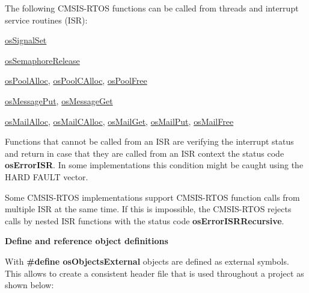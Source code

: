 The following C\+M\+S\+I\+S-\/\+R\+T\+OS functions can be called from threads and interrupt service routines (I\+SR)\+:
\begin{DoxyItemize}
\item \mbox{\hyperlink{cmsis__os_8h_a3de2730654589d6c3559c4b9e2825553}{os\+Signal\+Set}}
\item \mbox{\hyperlink{cmsis__os_8h_ab108914997c49e14d8ff1ae0d1988ca0}{os\+Semaphore\+Release}}
\item \mbox{\hyperlink{cmsis__os_8h_ab4bc93bf17f94ca99363e53e1a763fb5}{os\+Pool\+Alloc}}, \mbox{\hyperlink{cmsis__os_8h_ab22c2f194e0f0b05494aa0e9c97d7a51}{os\+Pool\+C\+Alloc}}, \mbox{\hyperlink{cmsis__os_8h_a4a861e9c469c9d0daf5721bf174f8e54}{os\+Pool\+Free}}
\item \mbox{\hyperlink{cmsis__os_8h_ac0dcf462fc92de8ffaba6cc004514a6d}{os\+Message\+Put}}, \mbox{\hyperlink{cmsis__os_8h_a6c6892b8f2296cca6becd57ca2d7e1ae}{os\+Message\+Get}}
\item \mbox{\hyperlink{cmsis__os_8h_ac985d7f260b80d7891157697b760aa02}{os\+Mail\+Alloc}}, \mbox{\hyperlink{cmsis__os_8h_a9e492e5839bf0d2bf66492e70eae3ddb}{os\+Mail\+C\+Alloc}}, \mbox{\hyperlink{cmsis__os_8h_ac6ad7e6e7d6c4a80e60da22c57a42ccd}{os\+Mail\+Get}}, \mbox{\hyperlink{cmsis__os_8h_a485ef6f81854ebda8ffbce4832181e02}{os\+Mail\+Put}}, \mbox{\hyperlink{cmsis__os_8h_a27c1060cf21393f96b4fd1ed1c0167cc}{os\+Mail\+Free}}
\end{DoxyItemize}

Functions that cannot be called from an I\+SR are verifying the interrupt status and return in case that they are called from an I\+SR context the status code {\bfseries os\+Error\+I\+SR}. In some implementations this condition might be caught using the H\+A\+RD F\+A\+U\+LT vector.

Some C\+M\+S\+I\+S-\/\+R\+T\+OS implementations support C\+M\+S\+I\+S-\/\+R\+T\+OS function calls from multiple I\+SR at the same time. If this is impossible, the C\+M\+S\+I\+S-\/\+R\+T\+OS rejects calls by nested I\+SR functions with the status code {\bfseries os\+Error\+I\+S\+R\+Recursive}.

{\bfseries Define and reference object definitions}

With {\bfseries \#define os\+Objects\+External} objects are defined as external symbols. This allows to create a consistent header file that is used throughout a project as shown below\+:


